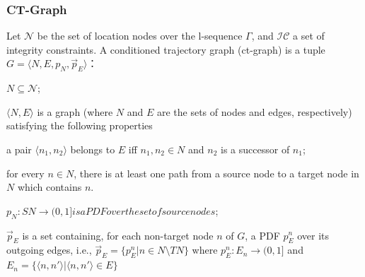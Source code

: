 \begin{frame}
\frametitle{CT-Graph}

\begin{definition}[CT-Graph]
  Let $\mathcal{N}$ be the set of location nodes over the l-sequence $\Gamma$, and $\mathcal{IC}$ a set of integrity constraints. A conditioned trajectory graph (ct-graph) is a tuple $G = \langle N, E, p_N, \vec{p}_E \rangle$：
  \begin{fitemize}
    \item $N \subseteq \mathcal{N}$;
    \item $\langle N,E \rangle$ is a graph (where $N$ and $E$ are the sets of nodes and edges, respectively) satisfying the following properties
      \begin{sitemize}
        \item a pair $\langle n_1, n_2 \rangle$ belongs to $E$ iff $n_1, n_2 \in N$ and $n_2$ is a successor of $n_1$;
        \item for every $n \in N$, there is at least one path from a source node to a target node in $N$ which contains $n$.
      \end{sitemize}
    \item $p_N: SN \rightarrow (0, 1] is a PDF over the set of source nodes$;
    \item $\vec{p}_E$ is a set containing, for each non-target node $n$ of $G$, a PDF $p^n_E$ over its outgoing edges, i.e., $\vec{p}_E = \{ p^n_E | n \in N \setminus TN \}$ where $p^n_E: E_n \rightarrow (0,1]$ and $E_n = \{ \langle n, n' \rangle | \langle n, n' \rangle \in E \}$
  \end{fitemize}
\end{definition}

\end{frame}
